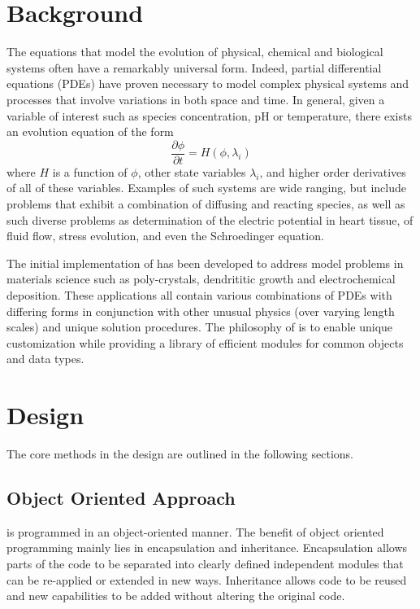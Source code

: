 \section{Background}

The equations that model the evolution of physical, chemical and
biological systems often have a remarkably universal form. Indeed,
partial differential equations (PDEs) have proven necessary to model
complex physical systems and processes that involve variations in both
space and time.  In general, given a variable of interest such as
species concentration, pH or temperature, there exists an evolution
equation of the form
\begin{equation}
  \frac{\partial \phi}{\partial t} = H(\phi, \lambda_i)
  \label{eqn:general-equation}
\end{equation}
where $H$ is a function of $\phi$, other state variables $\lambda_i$,
and higher order derivatives of all of these variables. Examples of
such systems are wide ranging, but include problems that exhibit a
combination of diffusing and reacting species, as well as such diverse
problems as determination of the electric potential in heart tissue,
of fluid flow, stress evolution, and even the Schroedinger equation.

The initial implementation of \FiPy{} has been developed to address
model problems in materials science such as poly-crystals, dendrititic
growth and electrochemical deposition. These applications all contain
various combinations of PDEs with differing forms in conjunction with
other unusual physics (over varying length scales) and unique solution
procedures. The philosophy of \FiPy{} is to enable unique
customization while providing a library of efficient modules for
common objects and data types.

\section{Design}

The core methods in the \FiPy{} design are outlined in the following
sections.

\subsection{Object Oriented Approach}

\FiPy{} is programmed in an object-oriented manner. The benefit of object
oriented programming mainly lies in encapsulation and
inheritance. Encapsulation allows parts of the code to be separated
into clearly defined independent modules that can be re-applied or
extended in new ways. Inheritance allows code to be reused and new
capabilities to be added without altering the original code.

